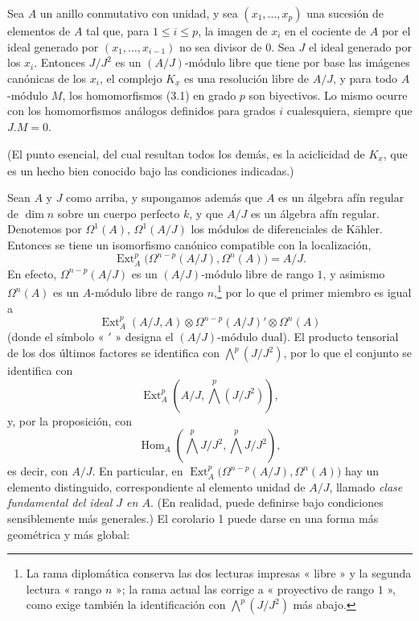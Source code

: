  Sea $A$ un anillo conmutativo con unidad, y sea
$(x_1,\ldots,x_p)$ una sucesión de elementos de $A$ tal que, para $1\leq i\leq p$,
la imagen de $x_i$ en el cociente de $A$ por el ideal generado por
$(x_1,\ldots,x_{i-1})$ no sea divisor de $0$. Sea $J$ el ideal generado
por los $x_i$. Entonces $J/J^{2}$ es un $(A/J)$-módulo libre que tiene por base las
imágenes canónicas de los $x_i$, el complejo $K_{\underline{x}}$ es una resolución
libre de $A/J$, y para todo $A$-módulo $M$, los homomorfismos (3.1) en
grado $p$ son biyectivos. Lo mismo ocurre con los homomorfismos análogos
definidos para grados $i$ cualesquiera, siempre que $J.M=0$.

(El punto esencial, del cual resultan todos los demás, es la aciclicidad de
$K_{\underline{x}}$, que es un hecho bien conocido bajo las condiciones indicadas.)

 Sean $A$ y $J$ como arriba, y supongamos además que
$A$ es un álgebra afín regular de $\dim n$ sobre un cuerpo perfecto $k$, y
que $A/J$ es un álgebra afín regular. Denotemos por $\Omega^{1}(A)$,
$\Omega^{1}(A/J)$ los módulos de diferenciales de Kähler. Entonces se tiene un
isomorfismo canónico compatible con la localización,
\begin{equation}\tag{3.5}
  \operatorname{Ext}_{A}^{p}\bigl(\Omega^{n-p}(A/J),\Omega^{n}(A)\bigr)=A/J.
\end{equation}
En efecto, $\Omega^{n-p}(A/J)$ es un $(A/J)$-módulo libre de rango $1$, y asimismo
$\Omega^{n}(A)$ es un $A$-módulo libre de rango $n$,\footnote{La rama diplomática
conserva las dos lecturas impresas « libre » y la segunda lectura « rango $n$ »;
la rama actual las corrige a « proyectivo de rango $1$ », como exige también
la identificación con $\bigwedge^{p}(J/J^{2})$ más abajo.}
por lo que el primer miembro es igual a
\[
  \operatorname{Ext}_{A}^{p}(A/J,A)
  \otimes\Omega^{n-p}(A/J)'\otimes\Omega^{n}(A)
\]
(donde el símbolo « $'$ » designa el $(A/J)$-módulo dual). El producto tensorial de los
dos últimos factores se identifica con $\bigwedge^{p}(J/J^{2})$, por lo que el conjunto
se identifica con
\[
  \operatorname{Ext}_{A}^{p}\!\left(A/J,\bigwedge^{p}(J/J^{2})\right),
\]
y, por la proposición, con
\[
  \operatorname{Hom}_{A}\!\left(\bigwedge^{p}J/J^{2},
  \bigwedge^{p}J/J^{2}\right),
\]
es decir, con $A/J$. En particular, en
$\operatorname{Ext}_{A}^{p}\bigl(\Omega^{n-p}(A/J),\Omega^{n}(A)\bigr)$ hay un
elemento distinguido, correspondiente al elemento unidad de $A/J$, llamado
\emph{clase fundamental del ideal $J$ en $A$}. (En realidad, puede
definirse bajo condiciones sensiblemente más generales.) El
corolario 1 puede darse en una forma más geométrica y más global:

